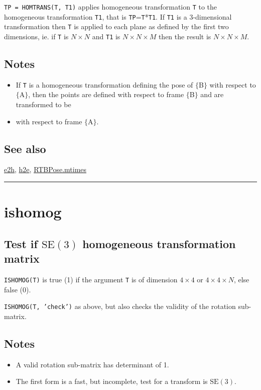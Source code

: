 \texttt{TP = HOMTRANS(T, T1)} applies homogeneous transformation \texttt{T} to the
homogeneous transformation \texttt{T1}, that is \texttt{TP}=\texttt{T}*\texttt{T1}.  If \texttt{T1} is a 3-dimensional
transformation then \texttt{T} is applied to each plane as defined by the first two
dimensions, ie. if \texttt{T} is $N \times N$ and \texttt{T1} is $N \times N \times M$ then the result is $N \times N \times M$.


\subsection*{Notes}
\begin{itemize}
  \item If \texttt{T} is a homogeneous transformation defining the pose of $\{$B$\}$ with respect to $\{$A$\}$,    then the points are defined with respect to frame $\{$B$\}$ and are transformed to be
  \item with respect to frame $\{$A$\}$.
\end{itemize}

\subsection*{See also}


\hyperlink{e2h}{\color{blue} e2h}, \hyperlink{h2e}{\color{blue} h2e}, \hyperlink{RTBPose.mtimes}{\color{blue} RTBPose.mtimes}

\vspace{1.5ex}\rule{\textwidth}{1mm}

\hypertarget{ishomog}{\section*{ishomog}}
\subsection*{Test if $\mbox{SE}(3)$ homogeneous transformation matrix}


\texttt{ISHOMOG(T)} is true (1) if the argument \texttt{T} is of dimension $4 \times 4$ or $4 \times 4 \times N$, else
false (0).



\texttt{ISHOMOG(T, 'check')} as above, but also checks the validity of the rotation
sub-matrix.


\subsection*{Notes}
\begin{itemize}
  \item A valid rotation sub-matrix has determinant of 1.
  \item The first form is a fast, but incomplete, test for a transform is $\mbox{SE}(3)$.
\end{itemize}

